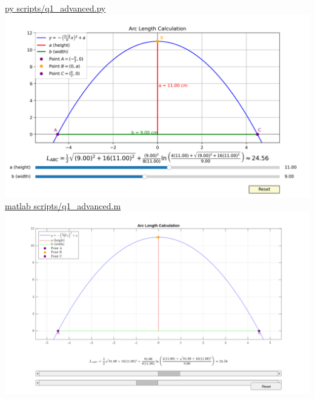 \documentclass[a4paper, 12pt]{report}
\def\link{blue!50!black}
\begin{document}
    \href{https://github.com/sakx7/mathcompuni/blob/main/py scripts/q1_advanced.py}{\textcolor{\link}{py scripts/q1\_advanced.py}}\\
    \includegraphics[scale=0.55]{images/Figure_1.png}\\
    \href{https://github.com/sakx7/mathcompuni/blob/main/matlab scripts/q1_advanced.m}{\textcolor{\link}{matlab scripts/q1\_advanced.m}}
    \includegraphics[scale=0.4]{images/rmatFigure_1.png}\\
   

    
\end{document}
